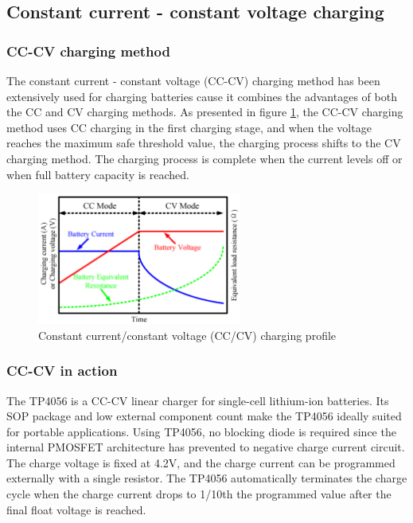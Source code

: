 \documentclass[\main/main.tex]{subfiles}
\begin{document}
\subsection{Constant current - constant voltage charging}

\subsubsection{CC-CV charging method}
The constant current - constant voltage (CC-CV) charging method has been extensively used for charging batteries cause it combines the advantages of both the CC and CV charging methods. As presented in figure \ref{fig:tp4056_cc_cv_profile}, the CC-CV charging method uses CC charging in the first charging stage, and when the voltage reaches the maximum safe threshold value, the charging process shifts to the CV charging method. The charging process is complete when the current levels off or when full battery capacity is reached.

\begin{figure}[H]
    \begin{center}
        \includegraphics[width=0.6\textwidth]{tp4056_cc_cv_profile.png}
    \end{center}
    \caption{Constant current/constant voltage (CC/CV) charging profile}
    \label{fig:tp4056_cc_cv_profile}
\end{figure}

\subsubsection{CC-CV in action}
The TP4056 is a CC-CV linear charger for single-cell lithium-ion batteries. Its SOP package and low external component count make the TP4056 ideally suited for portable applications. Using TP4056, no blocking diode is required since the internal PMOSFET architecture has prevented to negative charge current circuit. The charge voltage is
fixed at 4.2V, and the charge current can be programmed externally with a single resistor. The TP4056 automatically terminates the charge cycle when the charge current drops to 1/10th the programmed value after the final float voltage is reached. 
\end{document}
